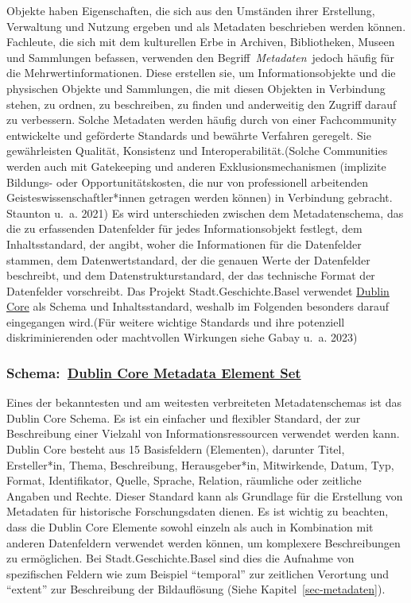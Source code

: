 \documentclass[
  letterpaper,
  DIV=11,
  numbers=noendperiod,
  landscape,
  a4paper,
  geometry:margin=1in]{scrartcl}
\begin{document}
Objekte haben Eigenschaften, die sich aus den Umständen ihrer
Erstellung, Verwaltung und Nutzung ergeben und als Metadaten beschrieben
werden können. Fachleute, die sich mit dem kulturellen Erbe in Archiven,
Bibliotheken, Museen und Sammlungen befassen, verwenden den
Begriff~\emph{Metadaten}~jedoch häufig für die Mehrwertinformationen.
Diese erstellen sie, um Informationsobjekte und die physischen Objekte
und Sammlungen, die mit diesen Objekten in Verbindung stehen, zu ordnen,
zu beschreiben, zu finden und anderweitig den Zugriff darauf zu
verbessern. Solche Metadaten werden häufig durch von einer Fachcommunity
entwickelte und geförderte Standards und bewährte Verfahren geregelt.
Sie gewährleisten Qualität, Konsistenz und Interoperabilität.(Solche
Communities werden auch mit Gatekeeping und anderen
Exklusionsmechanismen (implizite Bildungs- oder Opportunitätskosten, die
nur von professionell arbeitenden Geisteswissenschaftler*innen getragen
werden können) in Verbindung gebracht. Staunton u.~a. 2021) Es wird
unterschieden zwischen dem Metadatenschema, das die zu erfassenden
Datenfelder für jedes Informationsobjekt festlegt, dem Inhaltsstandard,
der angibt, woher die Informationen für die Datenfelder stammen, dem
Datenwertstandard, der die genauen Werte der Datenfelder beschreibt, und
dem Datenstrukturstandard, der das technische Format der Datenfelder
vorschreibt. Das Projekt Stadt.Geschichte.Basel verwendet
\href{https://www.dublincore.org}{Dublin Core} als Schema und
Inhaltsstandard, weshalb im Folgenden besonders darauf eingegangen
wird.(Für weitere wichtige Standards und ihre potenziell
diskriminierenden oder machtvollen Wirkungen siehe Gabay u.~a. 2023)

\subsubsection{\texorpdfstring{Schema:~\href{https://www.dublincore.org/specifications/dublin-core/dces/}{Dublin
Core Metadata Element
Set}}{Schema:~Dublin Core Metadata Element Set}}\label{schema-dublin-core-metadata-element-set}

Eines der bekanntesten und am weitesten verbreiteten Metadatenschemas
ist das Dublin Core Schema. Es ist ein einfacher und flexibler Standard,
der zur Beschreibung einer Vielzahl von Informationsressourcen verwendet
werden kann. Dublin Core besteht aus 15 Basisfeldern (Elementen),
darunter Titel, Ersteller*in, Thema, Beschreibung, Herausgeber*in,
Mitwirkende, Datum, Typ, Format, Identifikator, Quelle, Sprache,
Relation, räumliche oder zeitliche Angaben und Rechte. Dieser Standard
kann als Grundlage für die Erstellung von Metadaten für historische
Forschungsdaten dienen. Es ist wichtig zu beachten, dass die Dublin Core
Elemente sowohl einzeln als auch in Kombination mit anderen Datenfeldern
verwendet werden können, um komplexere Beschreibungen zu ermöglichen.
Bei Stadt.Geschichte.Basel sind dies die Aufnahme von spezifischen
Feldern wie zum Beispiel ``temporal'' zur zeitlichen Verortung und
``extent'' zur Beschreibung der Bildauflösung (Siehe
Kapitel~\ref{sec-metadaten}).
\end{document}
